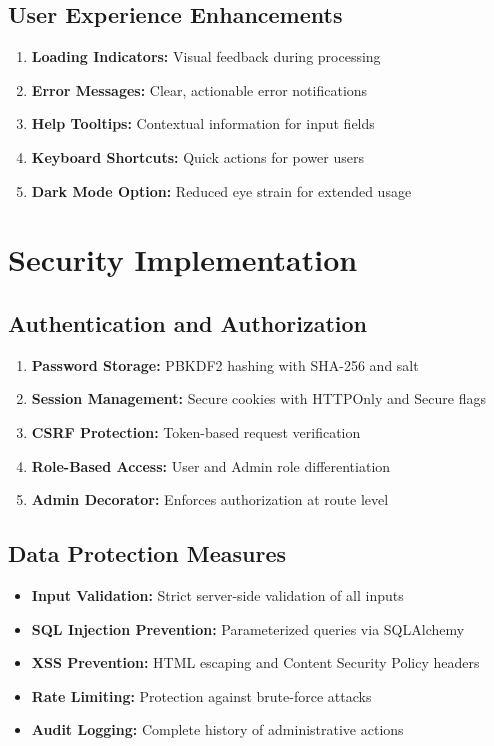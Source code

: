 \documentclass[12pt,a4paper,twoside]{report}
\begin{document}
\subsection{User Experience Enhancements}

\begin{enumerate}
    \item \textbf{Loading Indicators:} Visual feedback during processing
    \item \textbf{Error Messages:} Clear, actionable error notifications
    \item \textbf{Help Tooltips:} Contextual information for input fields
    \item \textbf{Keyboard Shortcuts:} Quick actions for power users
    \item \textbf{Dark Mode Option:} Reduced eye strain for extended usage
\end{enumerate}

\section{Security Implementation}

\subsection{Authentication and Authorization}

\begin{enumerate}
    \item \textbf{Password Storage:} PBKDF2 hashing with SHA-256 and salt
    \item \textbf{Session Management:} Secure cookies with HTTPOnly and Secure flags
    \item \textbf{CSRF Protection:} Token-based request verification
    \item \textbf{Role-Based Access:} User and Admin role differentiation
    \item \textbf{Admin Decorator:} Enforces authorization at route level
\end{enumerate}

\subsection{Data Protection Measures}

\begin{itemize}
    \item \textbf{Input Validation:} Strict server-side validation of all inputs
    \item \textbf{SQL Injection Prevention:} Parameterized queries via SQLAlchemy
    \item \textbf{XSS Prevention:} HTML escaping and Content Security Policy headers
    \item \textbf{Rate Limiting:} Protection against brute-force attacks
    \item \textbf{Audit Logging:} Complete history of administrative actions
\end{itemize}
\end{document}
